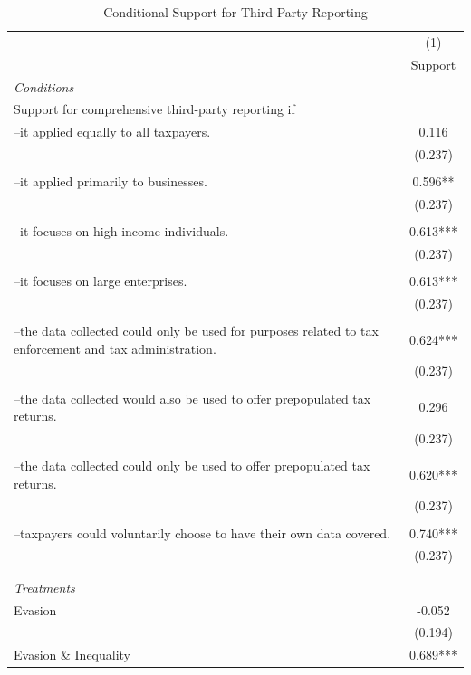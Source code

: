 \documentclass[11pt]{article}
\begin{document}
\FloatBarrier
\begin{table}[!htbp]\centering
\caption{Conditional Support for Third-Party Reporting}
\label{tab:conditionalsupporttpr_noc}
\begin{threeparttable}
\footnotesize
\begin{tabular}{l|c}
\toprule
 & (1)\\
 & Support \\
\midrule
\textit{Conditions} \\[0.25em]
Support for comprehensive third-party reporting if \\[0.25em]
--it applied equally to all taxpayers. & 0.116 \\
 & (0.237) \\\\[0.25em]
--it applied primarily to businesses. & 0.596** \\
 & (0.237) \\\\[0.25em]
--it focuses on high-income individuals. & 0.613*** \\
 & (0.237) \\\\[0.25em]
--it focuses on large enterprises. & 0.613*** \\
 & (0.237) \\\\[0.25em]
--the data collected could only be used for purposes related to tax enforcement and tax administration. & 0.624*** \\
 & (0.237) \\\\[0.25em]
--the data collected would also be used to offer prepopulated tax returns. & 0.296 \\
 & (0.237) \\\\[0.25em]
--the data collected could only be used to offer prepopulated tax returns. & 0.620*** \\
 & (0.237) \\\\[0.25em]
--taxpayers could voluntarily choose to have their own data covered. & 0.740*** \\
 & (0.237) \\\\[0.25em]
\\[1em]
\textit{Treatments} \\[0.25em]
Evasion & -0.052 \\
 & (0.194) \\
Evasion \& Inequality & 0.689*** \\

\end{tabular}
\end{threeparttable}
\end{table}
\end{document}

